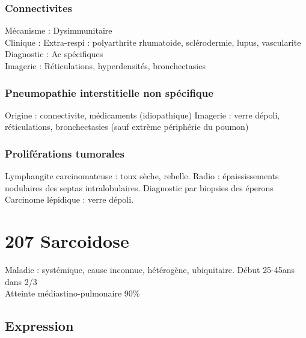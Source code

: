 \documentclass{article}
\begin{document}
\subsubsection{Connectivites}
Mécanisme : Dysimmunitaire\\
Clinique : Extra-respi : polyarthrite rhumatoide, sclérodermie, lupus, vascularite\\
Diagnostic : Ac spécifiques\\
Imagerie : Réticulations, hyperdensités, bronchectasies

\subsubsection{Pneumopathie interstitielle non spécifique}
Origine : connectivite, médicaments (idiopathique)
Imagerie : verre dépoli, réticulations, bronchectasies (sauf extrème périphérie du poumon)

\subsubsection{Proliférations tumorales}
Lymphangite carcinomateuse : toux sèche, rebelle. Radio : épaississements nodulaires des septas intralobulaires. Diagnostic par biopsies des éperons\\
Carcinome lépidique : verre dépoli. 


\section{207 Sarcoidose}
Maladie : systémique, cause inconnue, hétérogène, ubiquitaire. Début 25-45ans
dans 2/3\\
Atteinte médiastino-pulmonaire 90\%

\subsection{Expression}
\label{sec:org39048da}
\end{document}
